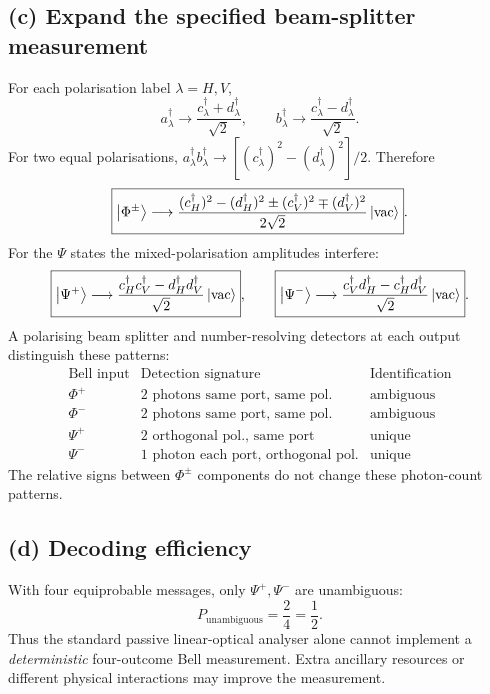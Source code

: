 \subsection*{(c) Expand the specified beam-splitter measurement}
For each polarisation label \(\lambda=H,V\),
\[
a_\lambda^\dagger\longrightarrow
\frac{c_\lambda^\dagger+d_\lambda^\dagger}{\sqrt2},
\qquad
b_\lambda^\dagger\longrightarrow
\frac{c_\lambda^\dagger-d_\lambda^\dagger}{\sqrt2}.
\]
For two equal polarisations,
\(a_\lambda^\dagger b_\lambda^\dagger
\to[(c_\lambda^\dagger)^2-
(d_\lambda^\dagger)^2]/2\). Therefore
\[
\boxed{\left\lvert \Phi^\pm\right\rangle\longrightarrow
\frac{(c_H^\dagger)^2-(d_H^\dagger)^2
\pm(c_V^\dagger)^2\mp(d_V^\dagger)^2}
{2\sqrt2}\left\lvert \mathrm{vac}\right\rangle}.
\]
For the \(\Psi\) states the mixed-polarisation
amplitudes interfere:
\[
\boxed{\left\lvert \Psi^+\right\rangle\longrightarrow
\frac{c_H^\dagger c_V^\dagger
-d_H^\dagger d_V^\dagger}{\sqrt2}
\left\lvert \mathrm{vac}\right\rangle},\qquad
\boxed{\left\lvert \Psi^-\right\rangle\longrightarrow
\frac{c_V^\dagger d_H^\dagger
-c_H^\dagger d_V^\dagger}{\sqrt2}
\left\lvert \mathrm{vac}\right\rangle}.
\]
A polarising beam splitter and number-resolving detectors
at each output distinguish these patterns:
\[
\begin{array}{c|l|c}
\text{Bell input}&\text{Detection signature}&
\text{Identification}\\\hline
\Phi^+&2\text{ photons same port, same pol.}&
\text{ambiguous}\\
\Phi^-&2\text{ photons same port, same pol.}&
\text{ambiguous}\\
\Psi^+&2\text{ orthogonal pol., same port}&
\text{unique}\\
\Psi^-&1\text{ photon each port, orthogonal pol.}&
\text{unique}
\end{array}
\]
The relative signs between \(\Phi^\pm\) components
do not change these photon-count patterns.

\subsection*{(d) Decoding efficiency}
With four equiprobable messages, only
\(\Psi^+,\Psi^-\) are unambiguous:
\[
\boxed{P_{\mathrm{unambiguous}}=\frac24=\frac12}.
\]
Thus the standard passive linear-optical analyser
alone cannot implement a \emph{deterministic}
four-outcome Bell measurement. Extra
ancillary resources or different physical
interactions may improve the measurement.
